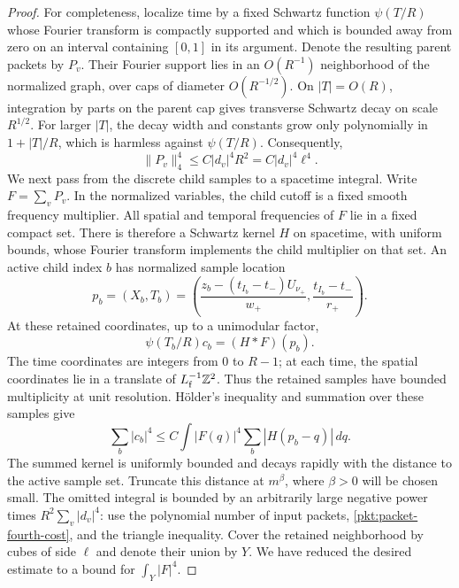 \begin{proof}
For completeness, localize time by a fixed Schwartz function
$\psi(T/R)$ whose Fourier transform is compactly supported and which
is bounded away from zero on an interval containing $[0,1]$ in its
argument.  Denote the resulting parent packets by $P_v$.  Their Fourier
support lies in an $O(R^{-1})$ neighborhood of the normalized graph,
over caps of diameter $O(R^{-1/2})$.  On $|T|=O(R)$, integration by
parts on the parent cap gives transverse Schwartz decay on scale
$R^{1/2}$.  For larger $|T|$, the decay width and constants grow only
polynomially in $1+|T|/R$, which is harmless against $\psi(T/R)$.
Consequently,
\begin{equation}\label{pkt:packet-fourth-cost}
 \|P_v\|_4^4\le C|d_v|^4R^2
                       =C|d_v|^4\ell^4.
\end{equation}
We next pass from the discrete child samples to a spacetime integral.
Write $F=\sum_vP_v$.  In the normalized variables, the child cutoff is
a fixed smooth frequency multiplier.  All spatial and temporal
frequencies of $F$ lie in a fixed compact set.  There is therefore a
Schwartz kernel $H$ on spacetime, with uniform bounds, whose Fourier
transform implements the child multiplier on that set.  An active
child index $b$ has normalized sample location
\[
 p_b=(X_b,T_b)=\left(
   \frac{z_b-(t_{I_b}-t_-)U_{\nu_+}}{w_+},
   \frac{t_{I_b}-t_-}{r_+}\right).
\]
At these retained coordinates, up to a unimodular factor,
\[
 \psi(T_b/R)c_b=(H*F)(p_b).
\]
The time coordinates are integers from $0$ to $R-1$; at each time,
the spatial coordinates lie in a translate of
$L_{\mathrm f}^{-1}\mathbb Z^2$.  Thus the retained samples have bounded
multiplicity at unit resolution.  H\"older's inequality and summation
over these samples give
\[
 \sum_b|c_b|^4
       \le C\int |F(q)|^4
                    \sum_b|H(p_b-q)|\,dq.
\]
The summed kernel is uniformly bounded and decays rapidly with the
distance to the active sample set.  Truncate this distance at $m^\beta$,
where $\beta>0$ will be chosen small.  The omitted integral is bounded by
an arbitrarily large negative power times
$R^2\sum_v|d_v|^4$: use the polynomial number of input packets,
\eqref{pkt:packet-fourth-cost}, and the triangle inequality.  Cover the
retained neighborhood by cubes of side $\ell$ and denote their union
by $Y$.  We have reduced the desired estimate to a bound for
$\int_Y|F|^4$.


\end{proof}
